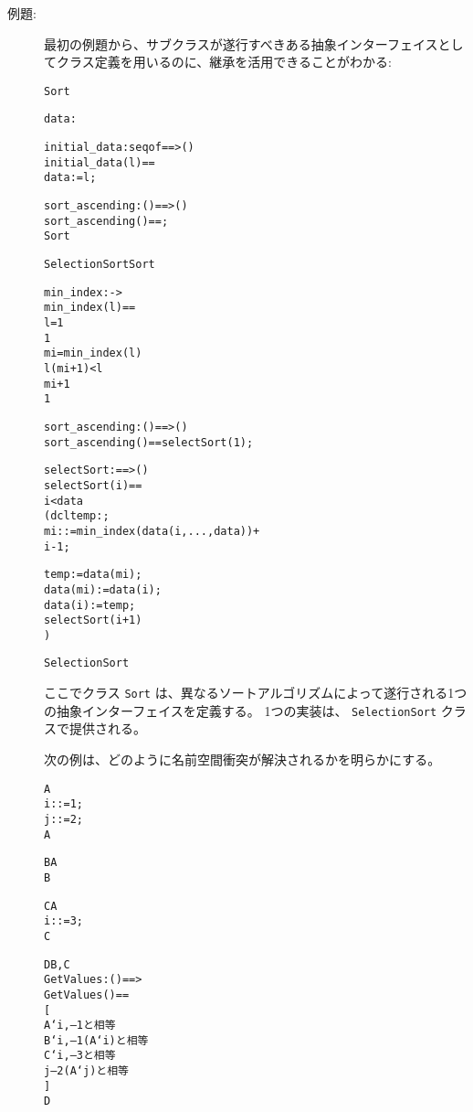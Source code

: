 \documentclass[\pformat,12pt]{jarticle}
\begin{document}
\begin{description}
\item[例題:] 最初の例題から、サブクラスが遂行すべきある抽象インターフェイスとしてクラス定義を用いるのに、継承を活用できることがわかる:
  \begin{alltt}
   Sort

      \PROTECTED data : 


      initial_data : seq of  ==> ()
      initial_data (l) == 
        data := l;

      sort_ascending : () ==> ()
      sort_ascending () == ;
     Sort

   SelectionSort  Sort


      min_index :  -> 
      min_index(l) ==
         l = 1
         1
         mi = min_index( l)
               l(mi+1) <  l
                mi+1
                1


      sort_ascending : () ==> ()
      sort_ascending () == selectSort(1);

      selectSort :  ==> ()
      selectSort (i) ==
         i <  data
         (dcl temp: ;
               mi:  := min_index(data(i,..., data)) + 
                            i - 1;
         
             temp := data(mi);
             data(mi) := data(i);
             data(i) := temp;
             selectSort(i+1)
             )

   SelectionSort
\end{alltt}
ここでクラス \texttt{Sort} は、異なるソートアルゴリズムによって遂行される1つの抽象インターフェイスを定義する。
1つの実装は、 \texttt{Selecti\-onSort} クラスで提供される。

次の例は、どのように名前空間衝突が解決されるかを明らかにする。
  \begin{alltt}
     A
        i:  := 1;
        j:  := 2;
     A

     B  A
     B

     C  A
        i:  := 3;
     C

     D  B,C
        GetValues: () ==> 
        GetValues() ==
           [
            A`i, -- 1と相等
            B`i, -- 1 (A`i)と相等
            C`i, -- 3と相等
            j   -- 2 (A`j)と相等
          ]
      D
  \end{alltt}
\end{description}
\end{document}
